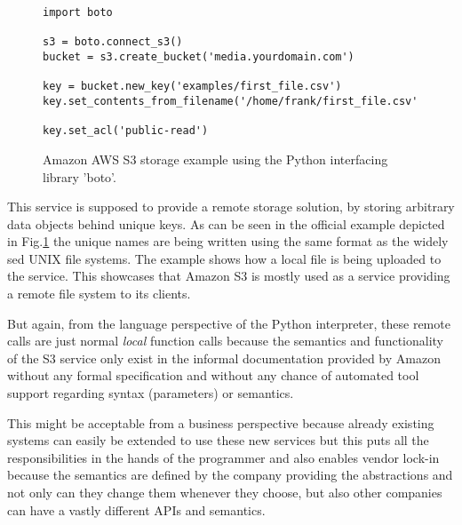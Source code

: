 \begin{figure}[h]
    \begin{lstlisting}
import boto

s3 = boto.connect_s3()
bucket = s3.create_bucket('media.yourdomain.com')

key = bucket.new_key('examples/first_file.csv')
key.set_contents_from_filename('/home/frank/first_file.csv')

key.set_acl('public-read')
    \end{lstlisting}
  \caption{Amazon AWS S3 storage example using the Python interfacing
          library 'boto'.}
  \label{pys3}
\end{figure}

This service is supposed to provide a remote storage solution,
by storing arbitrary data objects behind unique keys. As can be seen
in the official example \cite{pys3-example} depicted in Fig.\ref{pys3}
the unique names are being written using the same format as the widely
sed UNIX file systems. The example shows how a local file is being
uploaded to the service. This showcases that Amazon S3 is mostly used
as a service providing a remote file system to its clients.

But again, from the language perspective of the Python interpreter,
these remote calls are just normal \textit{local} function calls
because the semantics and functionality of the S3 service only
exist in the informal documentation provided by Amazon without any formal
specification and without any chance of automated tool support
regarding syntax (parameters) or semantics.

This might be acceptable from a business perspective because already
existing systems can easily be extended to use these new services
but this puts all the responsibilities in the hands of the programmer
and also enables vendor lock-in because the semantics are defined
by the company providing the abstractions and not only can they
change them whenever they choose, but also other companies can have
a vastly different APIs and semantics.

